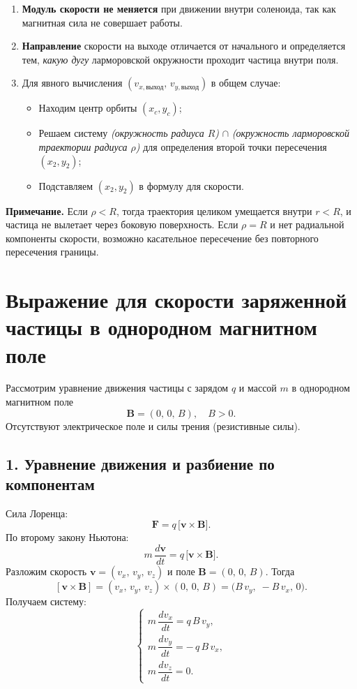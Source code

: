\documentclass{article}
\begin{document}
\begin{enumerate}
  \item \textbf{Модуль скорости не меняется} при движении внутри соленоида, так как магнитная сила не совершает работы.
  \item \textbf{Направление} скорости на выходе отличается от начального и определяется тем, \emph{какую дугу} ларморовской окружности проходит частица внутри поля.
  \item Для явного вычисления $(v_{x,\text{выход}},\,v_{y,\text{выход}})$ в общем случае:
  \begin{itemize}
    \item Находим центр орбиты $(x_c,y_c)$;
    \item Решаем систему \textit{(окружность радиуса $R$)} $\cap$ \textit{(окружность ларморовской траектории радиуса $\rho$)} для определения второй точки пересечения $(x_2,y_2)$;
    \item Подставляем $(x_2,y_2)$ в формулу для скорости.
  \end{itemize}
\end{enumerate}

\vspace{0.5cm}
\noindent
\textbf{Примечание.} Если $\rho < R$, тогда траектория целиком умещается внутри $r<R$, и частица не вылетает через боковую поверхность. Если $\rho = R$ и нет радиальной компоненты скорости, возможно касательное пересечение без повторного пересечения границы.
\section*{Выражение для скорости заряженной частицы в однородном магнитном поле}

Рассмотрим уравнение движения частицы с зарядом $q$ и массой $m$ в однородном магнитном поле
\[
\mathbf{B} = (0,\,0,\,B),
\quad B>0.
\]
Отсутствуют электрическое поле и силы трения (резистивные силы).

\subsection*{1. Уравнение движения и разбиение по компонентам}

Сила Лоренца:
\[
\mathbf{F} = q \,\bigl[\mathbf{v}\times \mathbf{B}\bigr].
\]
По второму закону Ньютона:
\[
m\,\frac{d\mathbf{v}}{dt}
=
q\,\bigl[\mathbf{v}\times \mathbf{B}\bigr].
\]
Разложим скорость
\(\mathbf{v} = (v_x,\,v_y,\,v_z)\)
и поле
\(\mathbf{B} = (0,\,0,\,B)\).
Тогда
\[
[\mathbf{v}\times \mathbf{B}]
=
(v_x,\,v_y,\,v_z)\times (0,\,0,\,B)
=
\bigl(B\,v_y,\;-B\,v_x,\,0\bigr).
\]
Получаем систему:
\[
\begin{cases}
m\,\dfrac{dv_x}{dt} = q\,B\,v_y,\\
m\,\dfrac{dv_y}{dt} = -\,q\,B\,v_x,\\
m\,\dfrac{dv_z}{dt} = 0.
\end{cases}
\]
\end{document}
